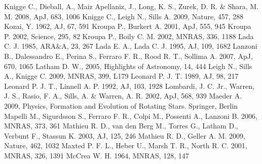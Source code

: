 \begin{thebibliography}{99}
  Knigge C., Dieball, A., Maiz Apellaniz, J., Long, K. S., Zurek,
  D. R. \& Shara, M. M. 2008, ApJ, 683, 1006
 Knigge C., Leigh N., Sills A. 2009,
  Nature, 457, 288
 Kozai,
  Y. 1962, AJ, 67, 591
 Kroupa
  P., Burkert A. 2001, ApJ, 555, 945
 Kroupa
  P. 2002, Science, 295, 82
 Kroupa
  P., Boily C. M. 2002, MNRAS, 336, 1188
 Lada C. J. 1985,
  ARA\&A, 23, 267
 Lada
  E. A., Lada C. J. 1995, AJ, 109, 1682
  Lanzoni B., Dalessandro E., Perina S., Ferraro F. R., Rood R. T.,
  Sollima A. 2007, ApJ, 670, 1065
 Latham
  D. W., 2005, Highlights of Astronomy, 14, 444
 Leigh
  N., Sills A., Knigge C. 2009, MNRAS, 399, L179
 Leonard
  P. J. T. 1989, AJ, 98, 217
  Leonard
  P. J. T., Linnell A. P. 1992, AJ, 103, 1928
  Lombardi, J. C. Jr., Warren, J. S., Rasio, F. A., Sills, A. \&
  Warren, A. R. 2002, ApJ, 568, 939
 Maeder A. 2009,
  Physics, Formation and Evolution of Rotating Stars. Springer, Berlin 
  Mapelli M., Sigurdsson S., Ferraro F. R., Colpi M., Possenti A., Lanzoni B. 2006,
  MNRAS, 373, 361
  Mathieu R. D., van den Berg M., Torres G., Latham D., Verbunt F.,
  Stassun K. 2003, AJ, 125, 246
  Mathieu R. D., Geller A. M. 2009, Nature, 462, 1032
  Maxted P. F. L., Heber U., Marsh T. R., North R. C. 2001,  MNRAS,
  326, 1391
 McCrea
  W. H. 1964, MNRAS, 128, 147

\end{thebibliography}
